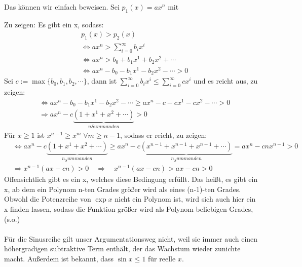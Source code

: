 \documentclass[a4paper,german,12pt,smallheadings]{scrartcl}
\begin{document}
Das können wir einfach beweisen. Sei $p_1(x)=ax^n$ mit 

Zu zeigen: Es gibt ein x, sodass:
\begin{align*}
  &p_1(x)>p_2(x)\\
  & \Leftrightarrow ax^n>\sum\limits_{i=0}^{\infty} b_i x^i\\
  & \Leftrightarrow ax^n>b_0+b_1x^1+b_2x^2+ \cdots\\
  & \Leftrightarrow ax^n-b_0-b_1x^1-b_2x^2- \cdots >0
\end{align*}
Sei $c:=\max\{b_0,b_1,b_2,\cdots\}$, dann ist $\sum\limits_{i=0}^{\infty} b_i x^i \leq \sum\limits_{i=0}^{\infty} c x^i$ und es reicht aus, zu zeigen:
\begin{align*}
  & \Leftrightarrow ax^n-b_0-b_1x^1-b_2x^2- \cdots \geq ax^n-c-cx^1-cx^2- \cdots>0\\
  & \Rightarrow ax^n-c\underbrace{\left(1+x^1+x^2+\cdots \right)}_{n Summanden}>0
\end{align*}
Für $x \geq 1$ ist $x^{n-1} \geq x^m \; \forall m \geq n-1$, sodass er reicht, zu zeigen:
\begin{align*}
  & \Leftrightarrow ax^n-c\underbrace{\left(1+x^1+x^2+\cdots \right)}_{n_Summanden} \geq ax^n-c\underbrace{\left(x^{n-1}+x^{n-1}+x^{n-1}+\cdots \right)}_{n_Summanden} = ax^n-cnx^{n-1} > 0\\
  & \Rightarrow x^{n-1}\left(ax-cn\right)>0 \quad \Rightarrow \quad x^{n-1}\left(ax-cn\right)>ax-cn>0
\end{align*}
Offensichtlich gibt es ein x, welches diese Bedingung erfüllt. Das heißt, es gibt ein x, ab dem ein Polynom n-ten Grades größer wird als eines (n-1)-ten Grades.\\
Obwohl die Potenzreihe von $\exp x$ nicht ein Polynom ist, wird sich auch hier ein x finden lassen, sodass die Funktion größer wird als Polynom beliebigen Grades, (s.o.) \\
\\
Für die Sinusreihe gilt unser Argumentationsweg nicht, weil sie immer auch einen
höhergradigen subtraktive Term enthält, der das Wachstum wieder zunichte macht.
Außerdem ist bekannt, dass $\sin x \le 1$ für reelle $x$.
\end{document}
